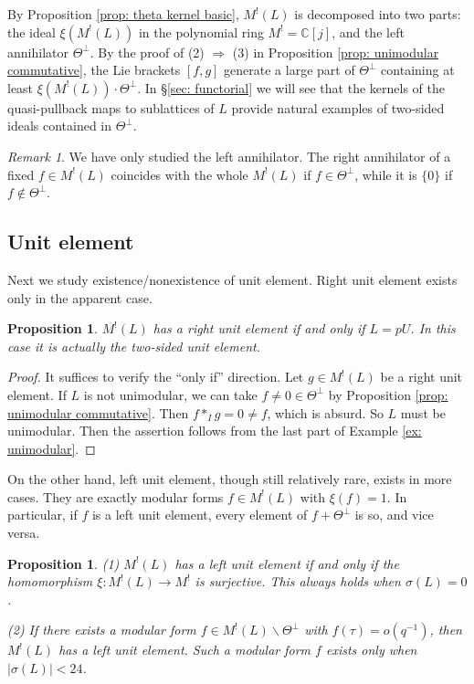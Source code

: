 \documentclass[12pt]{amsart}
\numberwithin{equation}{section}
\newtheorem{proposition}[theorem]{Proposition}
\theoremstyle{definition}
\theoremstyle{remark}
\newtheorem{remark}[theorem]{Remark}
\newcommand{\C}{\mathbb{C}}
\newcommand{\ML}{M^{!}(L)}
\begin{document}
By Proposition \ref{prop: theta kernel basic}, 
${\ML}$ is decomposed into two parts: 
the ideal $\xi({\ML})$ in the polynomial ring $M^{!}={\C}[j]$, 
and the left annihilator $\Theta^{\perp}$. 
By the proof of (2) $\Rightarrow$ (3) in Proposition \ref{prop: unimodular commutative},  
the Lie brackets $[f, g]$ generate a large part of $\Theta^{\perp}$ 
containing at least $\xi({\ML})\cdot \Theta^{\perp}$. 
In \S \ref{sec: functorial} we will see that 
the kernels of the quasi-pullback maps to sublattices of $L$ 
provide natural examples of two-sided ideals contained in $\Theta^{\perp}$. 

\begin{remark}
We have only studied the left annihilator. 
The right annihilator of a fixed $f\in {\ML}$ 
coincides with the whole ${\ML}$ if $f\in \Theta^{\perp}$, 
while it is $\{ 0 \}$ if $f\not\in \Theta^{\perp}$. 
\end{remark}



\subsection{Unit element}\label{ssec: unit}

Next we study existence/nonexistence of unit element. 
Right unit element exists only in the apparent case. 

\begin{proposition}\label{prop: RUE}
${\ML}$ has a right unit element if and only if $L=pU$. 
In this case it is actually the two-sided unit element. 
\end{proposition}

\begin{proof}
It suffices to verify the ``only if'' direction. 
Let $g\in {\ML}$ be a right unit element. 
If $L$ is not unimodular, we can take $f\ne 0 \in \Theta^{\perp}$ by Proposition \ref{prop: unimodular commutative}. 
Then $f\ast_{I}g=0\ne f$, which is absurd. 
So $L$ must be unimodular. 
Then the assertion follows from the last part of Example \ref{ex: unimodular}. 
\end{proof} 


On the other hand, 
left unit element, though still relatively rare, 
exists in more cases. 
They are exactly modular forms $f\in {\ML}$ with $\xi(f)=1$. 
In particular, if $f$ is a left unit element, 
every element of $f+\Theta^{\perp}$ is so, 
and vice versa. 


\begin{proposition}\label{prop: LUE}
(1) ${\ML}$ has a left unit element if and only if the homomorphism 
$\xi\colon {\ML}\to M^{!}$ is surjective. 
This always holds when $\sigma(L)=0$. 


(2) If there exists a modular form $f\in {\ML}\backslash \Theta^{\perp}$ with $f(\tau)=o(q^{-1})$, 
then ${\ML}$ has a left unit element. 
Such a modular form $f$ exists only when $|\sigma(L)|<24$. 
\end{proposition}
\end{document}
